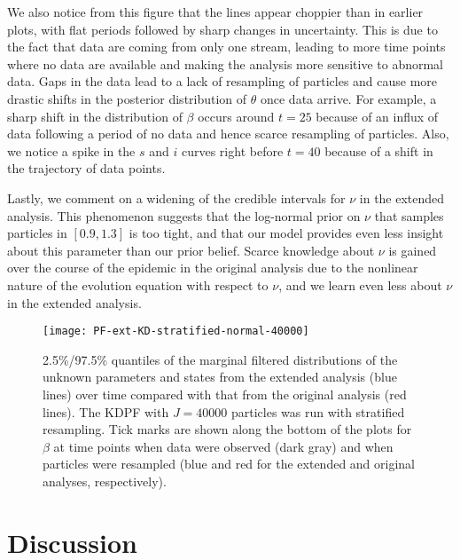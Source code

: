 \documentclass{elsarticle}
\begin{document}
We also notice from this figure that the lines appear choppier than in earlier plots, with flat periods followed by sharp changes in uncertainty. This is due to the fact that data are coming from only one stream, leading to more time points where no data are available and making the analysis more sensitive to abnormal data. Gaps in the data lead to a lack of resampling of particles and cause more drastic shifts in the posterior distribution of $\theta$ once data arrive. For example, a sharp shift in the distribution of $\beta$ occurs around $t = 25$ because of an influx of data following a period of no data and hence scarce resampling of particles. Also, we notice a spike in the $s$ and $i$ curves right before $t = 40$ because of a shift in the trajectory of data points.

Lastly, we comment on a widening of the credible intervals for $\nu$ in the extended analysis. This phenomenon suggests that the log-normal prior on $\nu$ that samples particles in $[0.9,1.3]$ is too tight, and that our model provides even less insight about this parameter than our prior belief. Scarce knowledge about $\nu$ is gained over the course of the epidemic in the original analysis due to the nonlinear nature of the evolution equation with respect to $\nu$, and we learn even less about $\nu$ in the extended analysis.

\begin{figure}
\centering
\texttt{[image: PF-ext-KD-stratified-normal-40000]}
\caption{2.5\%/97.5\% quantiles of the marginal filtered distributions of the unknown parameters and states from the extended analysis (blue lines) over time compared with that from the original analysis (red lines). The KDPF with $J = 40000$ particles was run with stratified resampling. Tick marks are shown along the bottom of the plots for $\beta$ at time points when data were observed (dark gray) and when particles were resampled (blue and red for the extended and original analyses, respectively).} \label{fig:ext}
\end{figure}

\section{Discussion \label{sec:discussion}}



\clearpage



\end{document}
